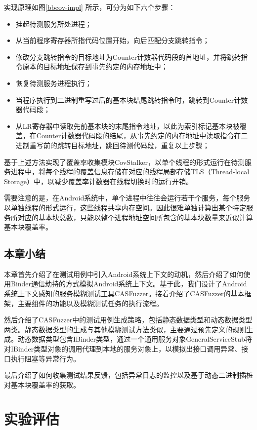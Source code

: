 \documentclass[winfonts,master,twoside]{njuthesis}
\begin{document}
实现原理如图\ref{bbcov-impl} 所示，可分为如下六个步骤：
\begin{itemize}
	\item 挂起待测服务所处进程；
	\item 从当前程序寄存器所指代码位置开始，向后匹配分支跳转指令；
	\item 修改分支跳转指令的目标地址为Counter计数器代码段的首地址，并将跳转指令原本的目标地址保存到事先约定的内存地址中；
	\item 恢复待测服务进程执行；
	\item 当程序执行到二进制重写过后的基本块结尾跳转指令时，跳转到Counter计数器代码段；
	\item 从LR寄存器中读取先前基本块的末尾指令地址，以此为索引标记基本块被覆盖，在Counter计数器代码段的结尾，从事先约定的内存地址中读取指令在二进制重写前的跳转目标地址，跳回待测代码段，重复以上步骤；
\end{itemize}

基于上述方法实现了覆盖率收集模块CovStalker，以单个线程的形式运行在待测服务进程中，将每个线程的覆盖信息存储在对应的线程局部存储TLS（Thread-local Storage）中，以减少覆盖率计数器在线程切换时的运行开销。

需要注意的是，在Android系统中，单个进程中往往会运行若干个服务，每个服务以单独线程的形式运行，这些线程共享内存空间。因此很难单独计算出某个特定服务所对应的基本块总数，只能以整个进程地址空间所包含的基本块数量来近似计算基本块覆盖率。

\section{本章小结}

本章首先介绍了在测试用例中引入Android系统上下文的动机，然后介绍了如何使用Binder通信劫持的方式模拟Android系统上下文。基于此，我们设计了Android系统上下文感知的服务模糊测试工具CASFuzzer。接着介绍了CASFuzzer的基本框架，主要组件的功能以及模糊测试任务的执行流程。

然后介绍了CASFuzzer中的测试用例生成策略，包括静态数据类型和动态数据类型两类。静态数据类型的生成与其他模糊测试方法类似，主要通过预先定义的规则生成。动态数据类型包含IBinder类型，通过一个通用服务对象GeneralServiceStub将对IBinder类型对象的调用代理到本地的服务对象上，以模拟出接口调用异常、接口执行阻塞等异常行为。

最后介绍了如何收集测试结果反馈，包括异常日志的监控以及基于动态二进制插桩对基本块覆盖率的获取。

\chapter{实验评估}
\end{document}
